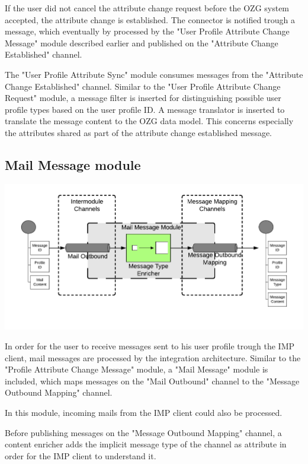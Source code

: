 If the user did not cancel the attribute change request before the OZG system accepted, the attribute change is established. The connector is notified trough a message, which eventually by processed by the "User Profile Attribute Change Message" module described earlier and published on the "Attribute Change Established" channel.

The "User Profile Attribute Sync" module consumes messages from the "Attribute Change Established" channel. Similar to the "User Profile Attribute Change Request" module, a message filter is inserted for distinguishing possible user profile types based on the user profile ID. A message translator is inserted to translate the message content to the OZG data model. This concerns especially the attributes shared as part of the attribute change established message.

\subsection{Mail Message module}

\begin{center}
    \includegraphics[scale=0.6]{Diagrams/Integration Architecture 1/Technological Integration/14. Mail Message Module.pdf}
\end{center}

In order for the user to receive messages sent to his user profile trough the IMP client, mail messages are processed by the integration architecture. Similar to the "Profile Attribute Change Message" module, a "Mail Message" module is included, which maps messages on the "Mail Outbound" channel to the "Message Outbound Mapping" channel.

In this module, incoming mails from the IMP client could also be processed.

Before publishing messages on the "Message Outbound Mapping" channel, a content enricher adds the implicit message type of the channel as attribute in order for the IMP client to understand it. 

